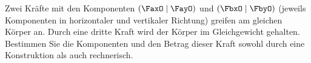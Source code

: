Zwei Kräfte mit den Komponenten $\left(\FaxO \mid \FayO\right)$ und $\left(\FbxO \mid \FbyO\right)$ (jeweils Komponenten in horizontaler und vertikaler Richtung) greifen am gleichen Körper an. Durch eine dritte Kraft wird der Körper im Gleichgewicht gehalten. Bestimmen Sie die Komponenten und den Betrag dieser Kraft sowohl durch eine Konstruktion als auch rechnerisch.
